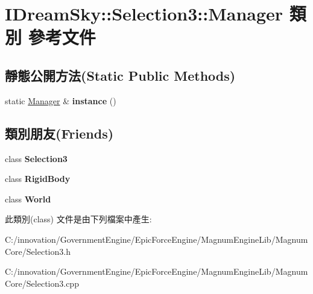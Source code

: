 \hypertarget{class_i_dream_sky_1_1_selection3_1_1_manager}{}\section{I\+Dream\+Sky\+:\+:Selection3\+:\+:Manager 類別 參考文件}
\label{class_i_dream_sky_1_1_selection3_1_1_manager}
\subsection*{靜態公開方法(Static Public Methods)}
\begin{DoxyCompactItemize}
\item 
static \hyperlink{class_i_dream_sky_1_1_selection3_1_1_manager}{Manager} \& {\bfseries instance} ()\hypertarget{class_i_dream_sky_1_1_selection3_1_1_manager_a941c59ba62c32db6b07fb69c2a1f6f0a}{}\label{class_i_dream_sky_1_1_selection3_1_1_manager_a941c59ba62c32db6b07fb69c2a1f6f0a}

\end{DoxyCompactItemize}
\subsection*{類別朋友(Friends)}
\begin{DoxyCompactItemize}
\item 
class {\bfseries Selection3}\hypertarget{class_i_dream_sky_1_1_selection3_1_1_manager_a47be81a0b31f3baf32d05bcb9a39f47d}{}\label{class_i_dream_sky_1_1_selection3_1_1_manager_a47be81a0b31f3baf32d05bcb9a39f47d}

\item 
class {\bfseries Rigid\+Body}\hypertarget{class_i_dream_sky_1_1_selection3_1_1_manager_abb8b03bec6b0a8e0834c8358c93039d2}{}\label{class_i_dream_sky_1_1_selection3_1_1_manager_abb8b03bec6b0a8e0834c8358c93039d2}

\item 
class {\bfseries World}\hypertarget{class_i_dream_sky_1_1_selection3_1_1_manager_a7b4bcdf992c21ae83363f25df05b1d25}{}\label{class_i_dream_sky_1_1_selection3_1_1_manager_a7b4bcdf992c21ae83363f25df05b1d25}

\end{DoxyCompactItemize}


此類別(class) 文件是由下列檔案中產生\+:\begin{DoxyCompactItemize}
\item 
C\+:/innovation/\+Government\+Engine/\+Epic\+Force\+Engine/\+Magnum\+Engine\+Lib/\+Magnum\+Core/Selection3.\+h\item 
C\+:/innovation/\+Government\+Engine/\+Epic\+Force\+Engine/\+Magnum\+Engine\+Lib/\+Magnum\+Core/Selection3.\+cpp\end{DoxyCompactItemize}
